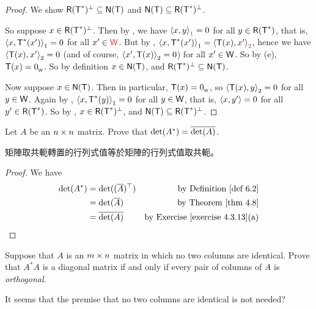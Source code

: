 \begin{proof}
We show \(\textsf{R}(\textsf{T}^*)^{\perp} \subseteq \textsf{N}(\textsf{T})\) and \(\textsf{N}(\textsf{T}) \subseteq \textsf{R}(\textsf{T}^*)^{\perp}\).

So suppose \(x \in \textsf{R}(\textsf{T}^*)^{\perp}\).
Then by , we have \(\LG x, y \RG_{\RED{1}} = 0\) for all \(y \in \textsf{R}(\textsf{T}^*)\), that is, \(\left< x, \textsf{T}^*(x') \right>_1 = 0\) for all \(x' \in \RED{\W}\).
But by , \(\LG x, \T^*(x') \RG_1 = \LG \T(x), x' \RG_{\MAROON{2}}\), hence we have \(\left< \textsf{T}(x), x' \right>_2 = 0\) (and of course, \(\left< x', \textsf{T}(x) \right>_2 = 0\)) for all \(x' \in \textsf{W}\).
So by (e), \(\textsf{T}(x) = 0_{_{\textsf{W}}}\).
So by definition \(x \in \textsf{N}(\textsf{T})\), and \(\textsf{R}(\textsf{T}^*)^{\perp} \subseteq \textsf{N}(\textsf{T})\).

Now suppose \(x \in \textsf{N}(\textsf{T})\).
Then in particular, \(\textsf{T}(x) = 0_{_{\textsf{W}}}\), so \(\left< \textsf{T}(x), y \right>_2 = 0\) for all \(y \in \textsf{W}\).
Again by , \(\left< x, \textsf{T}^*(y) \right>_1 = 0\) for all \(y \in \textsf{W}\), that is, \(\left< x, y' \right> = 0\) for all \(y' \in \textsf{R}(\textsf{T}^*)\).
So by , \(x \in \textsf{R}(\textsf{T}^*)^{\perp}\), and \(\textsf{N}(\textsf{T}) \subseteq \textsf{R}(\textsf{T}^*)^{\perp}\).
\end{proof}

\begin{exercise} \label{exercise 6.3.18}
Let \(A\) be an \(n \times n\) matrix.
Prove that \(\det(A^*) = \overline{\det(A)}\).
\end{exercise}

\begin{note}
矩陣取共軛轉置的行列式值等於矩陣的行列式值取共軛。
\end{note}

\begin{proof}
We have
\begin{align*}
    \det(A^*) & = \det((\conjugatet{A})^\top) & \text{by \DEF{6.2}} \\
        & = \det(\conjugatet{A}) & \text{by \THM{4.8}} \\
        & = \conjugatet{\det(A)} & \text{by \EXEC{4.3.13}(a)}
\end{align*}
\end{proof}

\begin{exercise} \label{exercise 6.3.19}
Suppose that \(A\) is an \(m \times n\) matrix in which no two columns are identical. Prove that \(A^* A\) is a diagonal matrix if and only if every pair of columns of \(A\) is \emph{orthogonal}.
\end{exercise}

\begin{note}
It seems that the premise that no two columns are identical is not needed?
\end{note}


